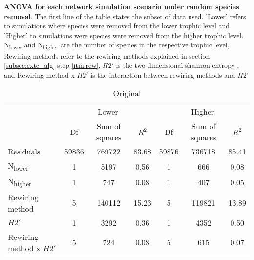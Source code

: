 \documentclass[12pt,a4paper]{article}
\begin{document}
\begin{table}[H]
\caption[ANOVA for each network simulation scenario under random species removal]{\textbf{ANOVA for each network simulation scenario under random species removal}. The first line of the table states the subset of data used. 'Lower' refers to simulations where species were removed from the lower trophic level and 'Higher' to simulations were species were removed from the higher trophic level. N\textsubscript{lower} and N\textsubscript{higher} are the number of species in the respective trophic level, Rewiring methods refer to the rewiring methods explained in section \ref{subsec:extc_alg} step \ref{itm:rew}, $H2'$ is the two dimensional shannon entropy \parencite{Bluethgen2006}, and Rewiring method x $H2'$ is the interaction between rewiring methods and $H2'$}
\label{tab:anova_by_cv}
    \begin{subtable}{\linewidth}
    \caption{Original}
    \centering
\begin{tabularx}{\linewidth}{@{} X *6{c} @{}}
\toprule
  & \multicolumn{3}{c}{Lower} & \multicolumn{3}{c}{Higher} \\ \cmidrule(l){2-4} \cmidrule(l){5-7}
  						& Df		& Sum of squares	& $R^2$	& Df 	& Sum of squares	& $R^2$ \\ \midrule
Residuals 				& 59836 & 769722			& 83.68	& 59876 & 736718 		& 85.41   \\
N\textsubscript{lower} 	& 1 		& 5197 			& 0.56 	& 1		& 666 			& 0.08  \\
N\textsubscript{higher} 	& 1 		& 747 			& 0.08	& 1 		& 407 			& 0.05  \\
Rewiring method 			& 5 		& 140112 		& 15.23 	& 5 		& 119821			& 13.89  \\
$H2'$ 					& 1 		& 3292 			& 0.36 	& 1 		& 4352			& 0.50 \\
Rewiring method x $H2'$ 	& 5 		& 724 			& 0.08 	& 5 		& 615			& 0.07  \\ \bottomrule
\end{tabularx}
\end{subtable}


\end{table}
\end{document}
